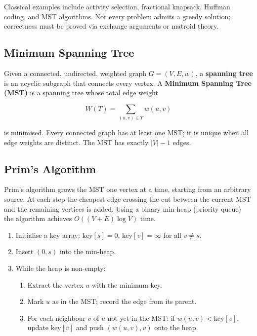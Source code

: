 \documentclass[12pt]{article}
\begin{document}
\hspace{0.8cm} Classical examples include activity selection, fractional knapsack,
Huffman coding, and MST algorithms. Not every problem admits a greedy solution;
correctness must be proved via exchange arguments or matroid theory.

\subsection*{Minimum Spanning Tree}

\hspace{0.8cm} Given a connected, undirected, weighted graph $G = (V, E, w)$, a
\textbf{spanning tree} is an acyclic subgraph that connects every vertex.
A \textbf{Minimum Spanning Tree (MST)} is a spanning tree whose total edge weight

\[
  W(T) = \sum_{(u,v) \in T} w(u,v)
\]

is minimised. Every connected graph has at least one MST; it is unique when all
edge weights are distinct. The MST has exactly $|V| - 1$ edges.

\subsection*{Prim's Algorithm}

\hspace{0.8cm} Prim's algorithm grows the MST one vertex at a time, starting from
an arbitrary source. At each step the cheapest edge crossing the cut between the
current MST and the remaining vertices is added. Using a binary min-heap (priority
queue) the algorithm achieves $O((V + E)\log V)$ time.

\begin{enumerate}
  \item Initialise a key array: $\text{key}[s] = 0$, $\text{key}[v] = \infty$ for all $v \neq s$.
  \item Insert $(0, s)$ into the min-heap.
  \item While the heap is non-empty:
  \begin{enumerate}
    \item Extract the vertex $u$ with the minimum key.
    \item Mark $u$ as in the MST; record the edge from its parent.
    \item For each neighbour $v$ of $u$ not yet in the MST: if $w(u,v) < \text{key}[v]$,
          update $\text{key}[v]$ and push $(w(u,v), v)$ onto the heap.
  \end{enumerate}
\end{enumerate}
\end{document}
